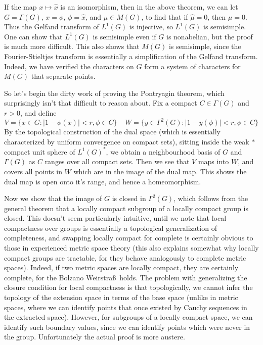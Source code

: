 \documentclass{article}
\theoremstyle{plain}
\theoremstyle{definition}
\begin{document}
If the map $x \mapsto \widehat{x}$ is an isomorphism, then in the above theorem, we can let $G = \Gamma(G)$, $x = \phi$, $\phi = \widehat{x}$, and $\mu \in M(G)$, to find that if $\widehat{\mu} = 0$, then $\mu = 0$. Thus the Gelfand transform of $L^1(G)$ is injective, so $L^1(G)$ is semisimple. One can show that $L^1(G)$ is semisimple even if $G$ is nonabelian, but the proof is much more difficult. This also shows that $M(G)$ is semisimple, since the Fourier-Stieltjes transform is essentially a simplification of the Gelfand transform. Indeed, we have verified the characters on $G$ form a system of characters for $M(G)$ that separate points.

So let's begin the dirty work of proving the Pontryagin theorem, which surprisingly isn't that difficult to reason about. Fix a compact $C \in \Gamma(G)$ and $r > 0$, and define
%
\[ V = \{ x \in G: |1 - \phi(x)| < r, \phi \in C \}\ \ \ \ \ W = \{ y \in \Gamma^2(G) : |1 - y(\phi)| < r, \phi \in C \} \]
%
By the topological construction of the dual space (which is essentially characterized by uniform convergence on compact sets), sitting inside the weak $*$ compact unit sphere of $L^1(G)^*$, we obtain a neighbourhood basis of $G$ and $\Gamma(G)$ as $C$ ranges over all compact sets. Then we see that $V$ maps into $W$, and covers all points in $W$ which are in the image of the dual map. This shows the dual map is open onto it's range, and hence a homeomorphism.

Now we show that the image of $G$ is closed in $\Gamma^2(G)$, which follows from the general theorem that a locally compact subgroup of a locally compact group is closed. This doesn't seem particularly intuitive, until we note that local compactness over groups is essentially a topological generalization of completeness, and swapping locally compact for complete is certainly obvious to those in experienced metric space theory (this also explains somewhat why locally compact groups are tractable, for they behave analogously to complete metric spaces). Indeed, if two metric spaces are locally compact, they are certainly complete, for the Bolzano Weirstra\ss\ holds. The problem with generalizing the closure condition for local compactness is that topologically, we cannot infer the topology of the extension space in terms of the base space (unlike in metric spaces, where we can identify points that once existed by Cauchy sequences in the extracted space). However, for subgroups of a locally compact space, we can identify such boundary values, since we can identify points which were never in the group. Unfortunately the actual proof is more austere.
\end{document}
